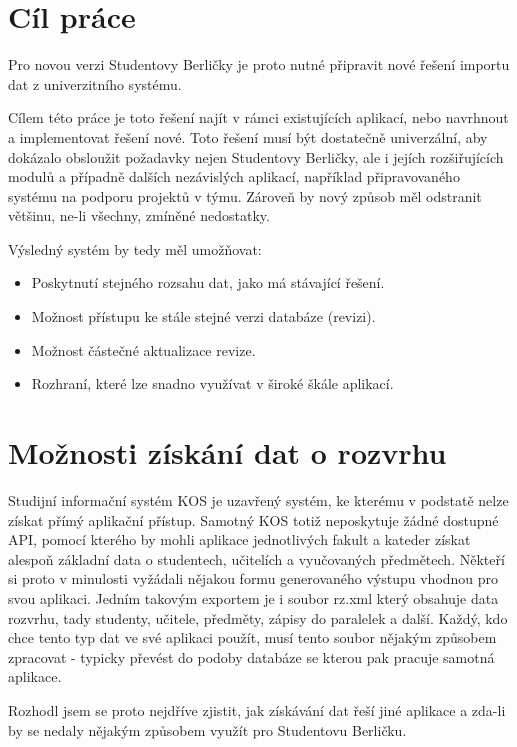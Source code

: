 \documentclass[11pt,twoside,a4paper]{book}
\begin{document}
\section{Cíl práce}
Pro novou verzi Studentovy Berličky je proto nutné připravit nové řešení importu dat z univerzitního systému.

Cílem této práce je toto řešení najít v rámci existujících aplikací, nebo navrhnout a implementovat řešení nové. Toto řešení musí být dostatečně univerzální, aby dokázalo obsloužit požadavky nejen Studentovy Berličky, ale i jejích rozšiřujících modulů a případně dalších nezávislých aplikací, například připravovaného systému na podporu projektů v týmu. Zároveň by nový způsob měl odstranit většinu, ne-li všechny, zmíněné nedostatky.

Výsledný systém by tedy měl umožňovat:
\begin{itemize}
\item Poskytnutí stejného rozsahu dat, jako má stávající řešení.
\item Možnost přístupu ke stále stejné verzi databáze (revizi).
\item Možnost částečné aktualizace revize.
\item Rozhraní, které lze snadno využívat v široké škále aplikací.
\end{itemize}

\section{Možnosti získání dat o rozvrhu}

Studijní informační systém KOS je uzavřený systém, ke kterému v podstatě nelze získat přímý aplikační přístup. Samotný KOS totiž neposkytuje žádné dostupné API, pomocí kterého by mohli aplikace jednotlivých fakult a kateder získat alespoň základní data o studentech, učitelích a vyučovaných předmětech. Někteří si proto v minulosti vyžádali nějakou formu generovaného výstupu vhodnou pro svou aplikaci. Jedním takovým exportem je i soubor rz.xml který obsahuje data rozvrhu, tady studenty, učitele, předměty, zápisy do paralelek a další. Každý, kdo chce tento typ dat ve své aplikaci použít, musí tento soubor nějakým způsobem zpracovat - typicky převést do podoby databáze se kterou pak pracuje samotná aplikace. 

Rozhodl jsem se proto nejdříve zjistit, jak získávání dat řeší jiné aplikace a zda-li by se nedaly nějakým způsobem využít pro Studentovu Berličku.
\end{document}

